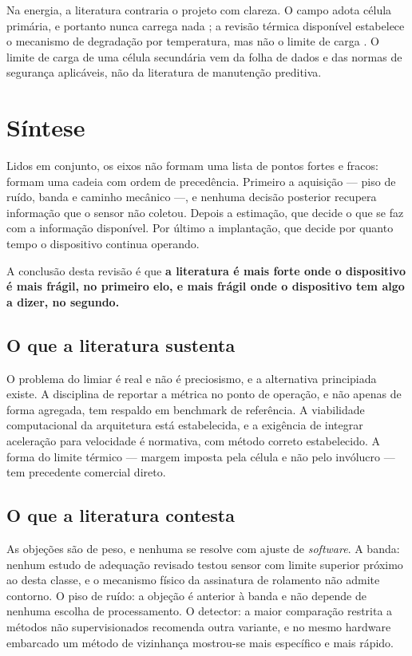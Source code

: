 Na energia, a literatura contraria o projeto com clareza. O campo adota célula primária, e
portanto nunca carrega nada \cite{nabavi2025}; a revisão térmica disponível estabelece o
mecanismo de degradação por temperatura, mas não o limite de carga \cite{ma2018}. O limite
de carga de uma célula secundária vem da folha de dados e das normas de segurança
aplicáveis, não da literatura de manutenção preditiva. 

\section{Síntese}
\label{sec:rev-sintese}

Lidos em conjunto, os eixos não formam uma lista de pontos fortes e fracos: formam uma
cadeia com ordem de precedência. Primeiro a aquisição --- piso de ruído, banda e caminho
mecânico ---, e nenhuma decisão posterior recupera informação que o sensor não coletou.
Depois a estimação, que decide o que se faz com a informação disponível. Por último a
implantação, que decide por quanto tempo o dispositivo continua operando.

A conclusão desta revisão é que \textbf{a literatura é mais forte onde o dispositivo é mais
frágil, no primeiro elo, e mais frágil onde o dispositivo tem algo a dizer, no segundo.}

\subsection{O que a literatura sustenta}

O problema do limiar é real e não é preciosismo, e a alternativa principiada existe. A
disciplina de reportar a métrica no ponto de operação, e não apenas de forma agregada, tem
respaldo em benchmark de referência. A viabilidade computacional da arquitetura está
estabelecida, e a exigência de integrar aceleração para velocidade é normativa, com método
correto estabelecido. A forma do limite térmico --- margem imposta pela célula e não pelo
invólucro --- tem precedente comercial direto.

\subsection{O que a literatura contesta}

As objeções são de peso, e nenhuma se resolve com ajuste de \emph{software}. A banda:
nenhum estudo de adequação revisado testou sensor com limite superior próximo ao desta
classe, e o mecanismo físico da assinatura de rolamento não admite contorno. O piso de
ruído: a objeção é anterior à banda e não depende de nenhuma escolha de processamento. O
detector: a maior comparação restrita a métodos não supervisionados recomenda outra
variante, e no mesmo hardware embarcado um método de vizinhança mostrou-se mais específico
e mais rápido. 

